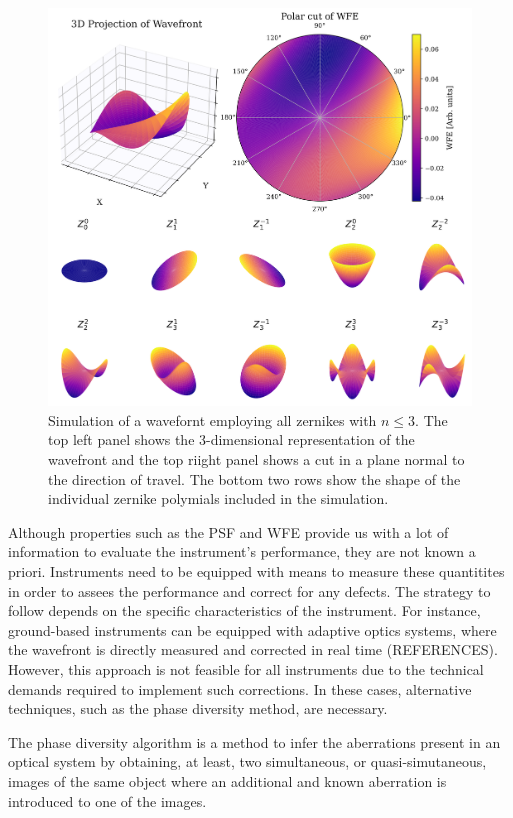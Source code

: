 \begin{figure}
  \centering
  \includegraphics[width = \textwidth]{figures/Introduction/zernikes_combined.pdf}
  \caption{Simulation of a wavefornt employing all zernikes with $n \leqslant 3$. The top left panel shows the 3-dimensional representation of the wavefront and the top riight panel shows a cut in a plane normal to the direction of travel. The bottom two rows show the shape of the individual zernike polymials included in the simulation.} 
  \label{fig_intro: zernikes}
\end{figure}

Although properties such as the PSF and WFE provide us with a lot of information to evaluate the instrument's performance, they are not known a priori. Instruments need to be equipped with means to measure these quantitites in order to assees the performance and correct for any defects. The strategy to follow depends on the specific characteristics of the instrument. For instance, ground-based instruments can be equipped with adaptive optics systems, where the wavefront is directly measured and corrected in real time (REFERENCES). However, this approach is not feasible for all instruments due to the technical demands required to implement such corrections. In these cases, alternative techniques, such as the phase diversity method, are necessary.

The phase diversity algorithm \citep{PD_original} is a method to infer the aberrations present in an optical system by obtaining, at least, two simultaneous, or quasi-simutaneous, images of the same object where an additional and known aberration is introduced to one of the images.  

